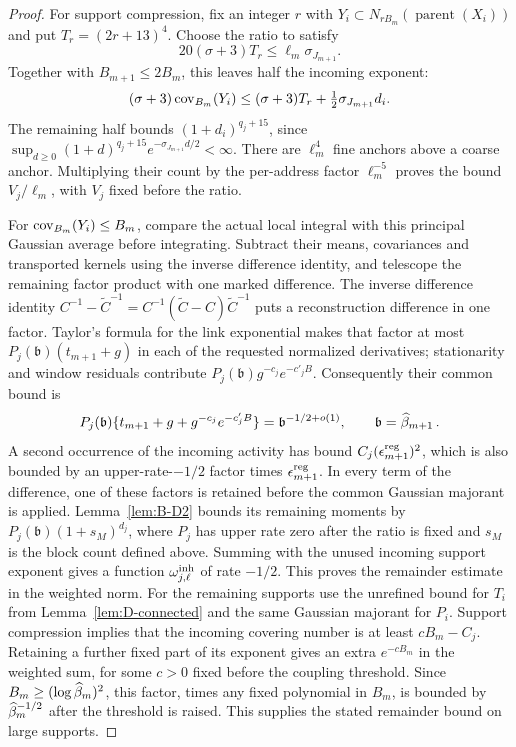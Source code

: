 \begin{proof}
For support compression, fix an integer $r$ with
$Y_i\subset N_{rB_m}(\operatorname{parent}(X_i))$ and put $T_r=(2r+13)^4$.
Choose the ratio to satisfy
\begin{equation*}
20(\sigma+3)T_r\le\ell_m\sigma_{J_{m+1}}.
\end{equation*}
Together with $B_{m+1}\le2B_m$, this leaves half the incoming exponent:
\begin{equation*}
(\sigma+3)\operatorname{cov}_{B_m}(Y_i)
\le (\sigma+3)T_r+\tfrac12\sigma_{J_{m+1}}d_i.
\end{equation*}
The remaining half bounds $(1+d_i)^{q_j+15}$, since
$\sup_{d\ge0}(1+d)^{q_j+15}e^{-\sigma_{J_{m+1}}d/2}<\infty$.
There are $\ell_m^4$ fine anchors above a coarse anchor. Multiplying their count by the per-address factor $\ell_m^{-5}$ proves the bound $V_j/\ell_m$, with $V_j$ fixed before the ratio.


For $\operatorname{cov}_{B_m}(Y_i)\le B_m$, compare the actual local integral with this principal Gaussian average before integrating. Subtract their means, covariances and transported kernels using the inverse difference identity, and telescope the remaining factor product with one marked difference. The inverse difference identity $C^{-1}-\widetilde C^{-1}=C^{-1}(\widetilde C-C)\widetilde C^{-1}$ puts a reconstruction difference in one factor. Taylor's formula for the link exponential makes that factor at most $P_j(\mathfrak b)(t_{m+1}+g)$ in each of the requested normalized derivatives; stationarity and window residuals contribute $P_j(\mathfrak b)g^{-c_j}e^{-c'_jB}$. Consequently their common bound is
\begin{equation*}
P_j(\mathfrak b)\{t_{m+1}+g+g^{-c_j}e^{-c'_jB}\}
=\mathfrak b^{-1/2+o(1)},\qquad \mathfrak b=\widehat{\beta}_{m+1}\,.
\end{equation*}
A second occurrence of the incoming activity has bound $C_j(\epsilon_{m+1}^{\rm reg})^2$, which is also bounded by an upper-rate-$-1/2$ factor times $\epsilon_{m+1}^{\rm reg}$. In every term of the difference, one of these factors is retained before the common Gaussian majorant is applied. Lemma~\ref{lem:B-D2} bounds its remaining moments by $P_j(\mathfrak b)(1+s_M)^{d_j}$, where $P_j$ has upper rate zero after the ratio is fixed and $s_M$ is the block count defined above. Summing with the unused incoming support exponent gives a function $\omega_{j,\ell}^{\rm inh}$ of rate $-1/2$. This proves the remainder estimate in the weighted norm. For the remaining supports use the unrefined bound for $T_i$ from Lemma~\ref{lem:D-connected} and the same Gaussian majorant for $P_i$. Support compression implies that the incoming covering number is at least $cB_m-C_j$. Retaining a further fixed part of its exponent gives an extra $e^{-cB_m}$ in the weighted sum, for some $c>0$ fixed before the coupling threshold. Since $B_m\ge(\log\widehat{\beta}_m)^2$, this factor, times any fixed polynomial in $B_m$, is bounded by $\widehat{\beta}_m^{-1/2}$ after the threshold is raised. This supplies the stated remainder bound on large supports.


\end{proof}
